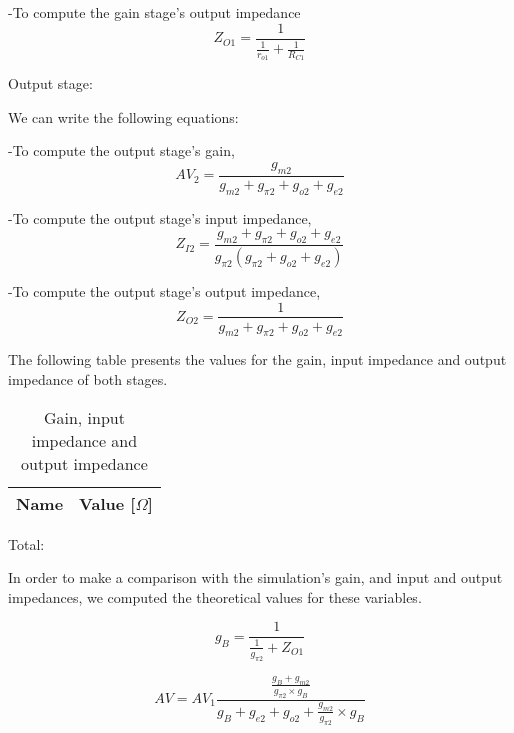 -To compute the gain stage's output impedance
\begin{equation}\label{eqesq}
Z_{O1} = \frac{1}{\frac{1}{r_{o1}}+\frac{1}{R_{C1}}}
\end{equation}

\quad Output stage:

We can write the following equations:

-To compute the output stage's gain, 
\begin{equation} \label{eq11}
AV_2 = \frac{g_{m2}}{g_{m2}+g_{\pi 2}+g_{o2}+g_{e2}}
\end{equation}

-To compute the output stage's input impedance,
\begin{equation} \label{eq12}
Z_{I2} = \frac{g_{m2}+g_{\pi 2}+g_{o2}+g_{e2}}{g_{\pi 2}(g_{\pi 2}+g_{o2}+g_{e2})}
\end{equation}

-To compute the output stage's output impedance,
\begin{equation} \label{eq13}
Z_{O2} = \frac{1}{g_{m2}+g_{\pi 2}+g_{o2}+g_{e2}}
\end{equation}

The following table presents the values for the gain, input impedance and output impedance of both stages.

\begin{table}[h]
  \centering
  \begin{tabular}{|l|r|}
    \hline    
    {\bf Name} & {\bf Value [$\Omega$]} \\ \hline
    
  \end{tabular}
  \caption{Gain, input impedance and output impedance}
  \label{tab:OP}
\end{table}
\FloatBarrier

\quad Total:

In order to make a comparison with the simulation's gain, and input and output impedances, we computed the theoretical values for these variables.

\begin{equation} \label{eq13}
g_B = \frac{1}{\frac{1}{g_{\pi 2}}+Z_{O1}}
\end{equation}

\begin{equation} \label{eq13}
AV = AV_1\frac{\frac{g_B+g_{m2}}{g_{\pi 2}\times g_B}}{g_B+g_{e2}+g_{o2}+\frac{g_{m2}}{g_{\pi 2}}\times g_B}
\end{equation}

